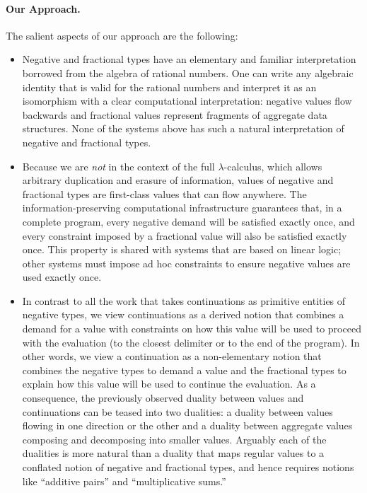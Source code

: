 \documentclass[preprint]{sigplanconf}
\begin{document}
\paragraph*{Our Approach.} The salient aspects of our approach are the following:
\begin{itemize}
\item Negative and fractional types have an elementary and familiar
  interpretation borrowed from the algebra of rational numbers. One can write
  any algebraic identity that is valid for the rational numbers and interpret
  it as an isomorphism with a clear computational interpretation: negative
  values flow backwards and fractional values represent fragments of
  aggregate data structures. None of the systems above has such a natural
  interpretation of negative and fractional types. 
\item Because we are \emph{not} in the context of the full
  $\lambda$-calculus, which allows arbitrary duplication and erasure of
  information, values of negative and fractional types are first-class values
  that can flow anywhere. The information-preserving computational
  infrastructure guarantees that, in a complete program, every negative
  demand will be satisfied exactly once, and every constraint imposed by a
  fractional value will also be satisfied exactly once. This property is
  shared with systems that are based on linear logic; other systems must
  impose ad hoc constraints to ensure negative values are used exactly
  once. 
\item In contrast to all the work that takes continuations as primitive
  entities of negative types, we view continuations as a derived notion that
  combines a demand for a value with constraints on how this value will be
  used to proceed with the evaluation (to the closest delimiter or to the end
  of the program). In other words, we view a continuation as a non-elementary
  notion that combines the negative types to demand a value and the
  fractional types to explain how this value will be used to continue the
  evaluation. As a consequence, the previously observed duality between
  values and continuations can be teased into two dualities: a duality
  between values flowing in one direction or the other and a duality between
  aggregate values composing and decomposing into smaller values. Arguably
  each of the dualities is more natural than a duality that maps regular
  values to a conflated notion of negative and fractional types, and hence
  requires notions like ``additive pairs'' and ``multiplicative sums.''
\end{itemize}
\end{document}
